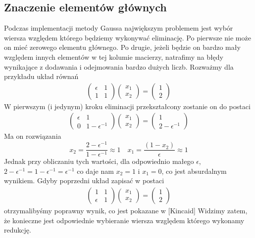 \documentclass[11pt,wide]{mwart}
\begin{document}
\subsection{Znaczenie elementów głównych}
Podczas implementacji metody Gaussa największym problemem jest wybór wiersza względem którego będziemy wykonywać eliminację. Po pierwsze nie może on mieć zerowego elementu głównego. Po drugie, jeżeli będzie on bardzo mały względem innych elementów w tej kolumie macierzy, natrafimy na błędy wynikające z dodawania i odejmowania bardzo dużych liczb. Rozważmy dla przykładu układ równań
\begin{align} \label{eq:gaussfail}
\left(\begin{matrix}
\epsilon & 1	\\
       1 & 1
\end{matrix}\right)
\left(\begin{matrix}
x_1 \\ x_2
\end{matrix}\right) = 
\left(\begin{matrix}
1 \\ 2
\end{matrix}\right)
\end{align}
W pierwszym (i jedynym) kroku eliminacji przekształcony zostanie on do postaci
\begin{align*}
\left(\begin{matrix}
\epsilon & 1	\\
 0 & 1 - \epsilon^{-1}
\end{matrix}\right)
\left(\begin{matrix}
x_1 \\ x_2
\end{matrix}\right) = 
\left(\begin{matrix}
1 \\ 2 - \epsilon^{-1}
\end{matrix}\right)
\end{align*}
Ma on rozwiązania 
$$ 
x_2 = \frac{2 - \epsilon^{-1}}{1 - \epsilon^{-1}} \approx 1 \quad x_1 = \frac{(1 - x_2)}{\epsilon} \approx 1
$$
Jednak przy obliczaniu tych wartości, dla odpowiednio małego $ \epsilon $,  $ 2 - \epsilon^{-1} = 1 - \epsilon^{-1} = \epsilon^{-1} $ co daje nam $ x_2 = 1 $ i $ x_1 = 0 $, co jest absurdalnym wynikiem. Gdyby poprzedni układ zapisać w postaci
\begin{align*}
\left(\begin{matrix}
       1 & 1 \\
\epsilon & 1
\end{matrix}\right)
\left(\begin{matrix}
x_1 \\ x_2
\end{matrix}\right) = 
\left(\begin{matrix}
1 \\ 2
\end{matrix}\right)
\end{align*}
otrzymalibyśmy poprawny wynik, co jest pokazane w [Kincaid]
Widzimy zatem, że konieczne jest odpowiednie wybieranie wiersza względem którego wykonamy redukcję.
\end{document}
